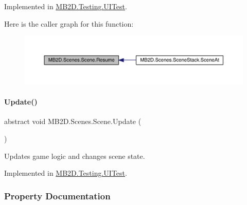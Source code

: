 Implemented in \hyperlink{class_m_b2_d_1_1_testing_1_1_u_i_test_a933c2bf347db47bf2921709c10d78acc}{M\+B2\+D.\+Testing.\+U\+I\+Test}.

Here is the caller graph for this function\+:
\nopagebreak
\begin{figure}[H]
\begin{center}
\leavevmode
\includegraphics[width=350pt]{class_m_b2_d_1_1_scenes_1_1_scene_ad13639db22b059a1b714eefd9d927735_icgraph}
\end{center}
\end{figure}
\hypertarget{class_m_b2_d_1_1_scenes_1_1_scene_a779de7c1ab23b698dcde3a228324a991}{}\label{class_m_b2_d_1_1_scenes_1_1_scene_a779de7c1ab23b698dcde3a228324a991} 
\paragraph{\texorpdfstring{Update()}{Update()}}
{\footnotesize\ttfamily abstract void M\+B2\+D.\+Scenes.\+Scene.\+Update (\begin{DoxyParamCaption}{ }\end{DoxyParamCaption})\hspace{0.3cm}{\ttfamily [pure virtual]}}



Updates game logic and changes scene state. 



Implemented in \hyperlink{class_m_b2_d_1_1_testing_1_1_u_i_test_a547d5592fee47d4c9354ee8f307c8813}{M\+B2\+D.\+Testing.\+U\+I\+Test}.



\subsubsection{Property Documentation}
\hypertarget{class_m_b2_d_1_1_scenes_1_1_scene_a8d5434f75a273135d8bae9ce36cc69ee}{}\label{class_m_b2_d_1_1_scenes_1_1_scene_a8d5434f75a273135d8bae9ce36cc69ee} 
